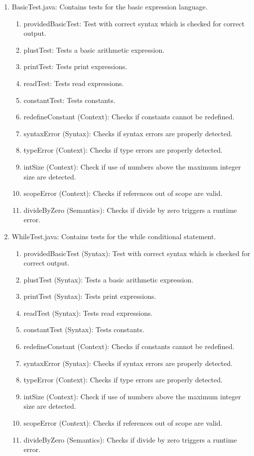 \documentclass[paper=a4, fontsize=11pt]{article}
\numberwithin{equation}{section}		%
\numberwithin{figure}{section}			%
\numberwithin{table}{section}				%
\begin{document}
\begin{enumerate}
\item BasicTest.java: Contains tests for the basic expression language.
  \begin{enumerate}
  \item providedBasicTest: Test with correct syntax which is checked for correct output.
  \item plustTest: Tests a basic arithmetic expression.
  \item printTest: Tests print expressions.
  \item readTest: Tests read expressions.
  \item constantTest: Tests constants.
  \item redefineConstant (Context): Checks if constants cannot be redefined.
  \item syntaxError (Syntax): Checks if syntax errors are properly detected.
  \item typeError (Context): Checks if type errors are properly detected.
  \item intSize (Context): Check if use of numbers above the maximum integer size are detected.
  \item scopeError (Context): Checks if references out of scope are valid.
  \item divideByZero (Semantics): Checks if divide by zero triggers a runtime error.
  \end{enumerate}

\item WhileTest.java: Contains tests for the while conditional statement.
  \begin{enumerate}
  \item providedBasicTest (Syntax): Test with correct syntax which is checked for correct output.
  \item plustTest (Syntax): Tests a basic arithmetic expression.
  \item printTest (Syntax): Tests print expressions.
  \item readTest (Syntax): Tests read expressions.
  \item constantTest (Syntax): Tests constants.
  \item redefineConstant (Context): Checks if constants cannot be redefined.
  \item syntaxError (Syntax): Checks if syntax errors are properly detected.
  \item typeError (Context): Checks if type errors are properly detected.
  \item intSize (Context): Check if use of numbers above the maximum integer size are detected.
  \item scopeError (Context): Checks if references out of scope are valid.
  \item divideByZero (Semantics): Checks if divide by zero triggers a runtime error.
  \end{enumerate}


\end{enumerate}
\end{document}
